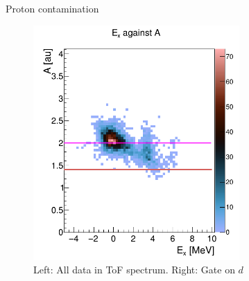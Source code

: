 \documentclass[sans,
frameno, %
mp,
usenames,dvipsnames, %
onlytextwidth, %
t,%
11pt]{beamer}
\newcommand{\iso}[2]{\ce{^{#1}#2}}
\begin{document}
\begin{frame}[c]{Proton contamination}
{\begin{figure}
\begin{minipage}[t]{0.48\linewidth}
            \end{minipage}
            \hfill
            \begin{minipage}[t]{0.48\linewidth}
                \centering
                \includegraphics[width=0.7\textwidth]{figures/Workshop/ex_mass_d.png}
            \end{minipage}
            \caption{Left: All data in ToF spectrum. Right: Gate on $d$}
        \end{figure}

    }
\end{frame}


\end{document}
